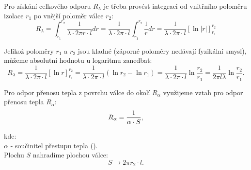 \documentclass{article}
\begin{document}
\begin{center}
\end{center}

Pro získání celkového odporu $R_\lambda$ je třeba provést integraci od vnitřního poloměru izolace $r_1$ po vnější poloměr válce $r_2$:
$$
    R_\lambda = \int_{r_1}^{r_2} \frac{1}{\lambda \cdot 2 \pi r \cdot l} dr = \frac{1}{\lambda \cdot 2 \pi \cdot l} \int_{r_1}^{r_2} \frac{1}{r} dr = \frac{1}{\lambda \cdot 2 \pi \cdot l} \left[ \ln |r| \right]_{r_1}^{r_2}
$$

Jelikož poloměry $r_1$ a $r_2$ jsou kladné (záporné poloměry nedávají fyzikální smysl), můžeme absolutní hodnotu u logaritmu zanedbat:
$$
    R_\lambda = \frac{1}{\lambda \cdot 2 \pi \cdot l} \left[ \ln r \right]_{r_1}^{r_2} = \frac{1}{\lambda \cdot 2 \pi \cdot l} \left( \ln r_2 - \ln r_1 \right) = \frac{1}{\lambda \cdot 2 \pi \cdot l} \ln \frac{r_2}{r_1} = \frac{1}{2 \pi l \lambda} \ln \frac{r_2}{r_1}.
$$

Pro odpor přenosu tepla z povrchu válce do okolí $R_\alpha$ využijeme vztah pro odpor přenosu tepla $R_\alpha$:
\begin{equation}
    R_\alpha = \frac{1}{\alpha \cdot S},
    \unit{(\ueqKandWinv)}
\end{equation}

kde:\\
$\alpha$ - součinitel přestupu tepla (\ueqWandMinvsqKinv).\\

Plochu $S$ nahradíme plochou válce:
$$
    S \rightarrow 2 \pi r_2 \cdot l.
$$
\end{document}
